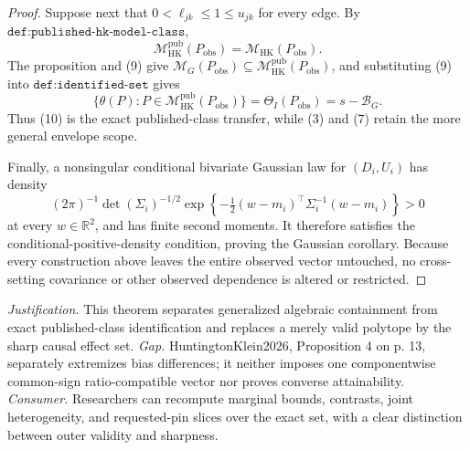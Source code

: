 \documentclass{article}
\begin{document}
\begin{proof}
Suppose next that \(0<\ell_{jk}\le1\le u_{jk}\) for every edge.  By \(\texttt{def:published-hk-model-class}\),
\[
\mathcal M_{\mathrm{HK}}^{\mathrm{pub}}(P_{\mathrm{obs}})
=\mathcal M_{\mathrm{HK}}(P_{\mathrm{obs}}). \tag{9}
\]
The proposition and (9) give \(\mathcal M_G(P_{\mathrm{obs}})\subseteq\mathcal M_{\mathrm{HK}}^{\mathrm{pub}}(P_{\mathrm{obs}})\), and substituting (9) into \(\texttt{def:identified-set}\) gives
\[
\{\theta(P):P\in\mathcal M_{\mathrm{HK}}^{\mathrm{pub}}(P_{\mathrm{obs}})\}
=\Theta_I(P_{\mathrm{obs}})=s-\mathcal B_G. \tag{10}
\]
Thus (10) is the exact published-class transfer, while (3) and (7) retain the more general envelope scope.

Finally, a nonsingular conditional bivariate Gaussian law for \((D_i,U_i)\) has density
\[
(2\pi)^{-1}\det(\Sigma_i)^{-1/2}
\exp\!\left\{-\tfrac12(w-m_i)^\top\Sigma_i^{-1}(w-m_i)\right\}>0
\]
at every \(w\in\mathbb R^2\), and has finite second moments.  It therefore satisfies the conditional-positive-density condition, proving the Gaussian corollary.  Because every construction above leaves the entire observed vector untouched, no cross-setting covariance or other observed dependence is altered or restricted.
\end{proof}
\par\smallskip\noindent \textit{Justification.} This theorem separates generalized algebraic containment from exact published-class identification and replaces a merely valid polytope by the sharp causal effect set. \textit{Gap.} HuntingtonKlein2026, Proposition 4 on p. 13, separately extremizes bias differences; it neither imposes one componentwise common-sign ratio-compatible vector nor proves converse attainability. \textit{Consumer.} Researchers can recompute marginal bounds, contrasts, joint heterogeneity, and requested-pin slices over the exact set, with a clear distinction between outer validity and sharpness.
\end{document}

